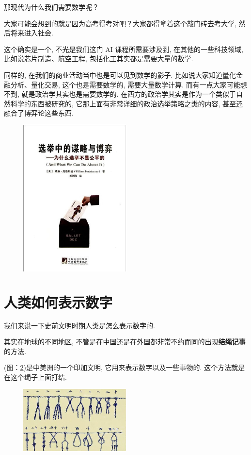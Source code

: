 那现代为什么我们需要数学呢？

大家可能会想到的就是因为高考得考对吧？大家都得拿着这个敲门砖去考大学, 然后将来进入社会. 

这个确实是一个, 不光是我们这门 AI 课程所需要涉及到, 在其他的一些科技领域, 比如说芯片制造、航空工程, 包括化工其实都是需要大量的数学. 

同样的, 在我们的商业活动当中也是可以见到数学的影子. 比如说大家知道量化金融分析、量化交易, 这个也是需要数学的, 需要大量数学计算. 而有一点大家可能想不到, 就是政治学其实也是需要数学的. 在西方的政治学其实是作为一个类似于自然科学的东西被研究的, 它那上面有非常详细的政治选举策略之类的内容, 甚至还融合了博弈论这些东西. 

\begin{figure}[ht]
  \centering
  \includegraphics[width=0.5\textwidth]{asset/7e4f1c0f-936f-4b29-82e1-5294232218f3.png}
  \caption{}
  \label{fig:img2_2}
\end{figure}

\section{人类如何表示数字}

我们来说一下史前文明时期人类是怎么表示数字的. 

其实在地球的不同地区, 不管是在中国还是在外国都非常不约而同的出现\textbf{结绳记事}的方法. 

(图：\ref{fig:img2_3})是中美洲的一个印加文明, 它用来表示数字以及一些事物的. 这个方法就是在这个绳子上面打结. 

\begin{figure}[ht]
  \centering\includegraphics[width=0.5\textwidth]{asset/73a095be-4ca9-4065-abb0-5d919706b1dd.png}
  \caption{}
  \label{fig:img2_3}
\end{figure}

